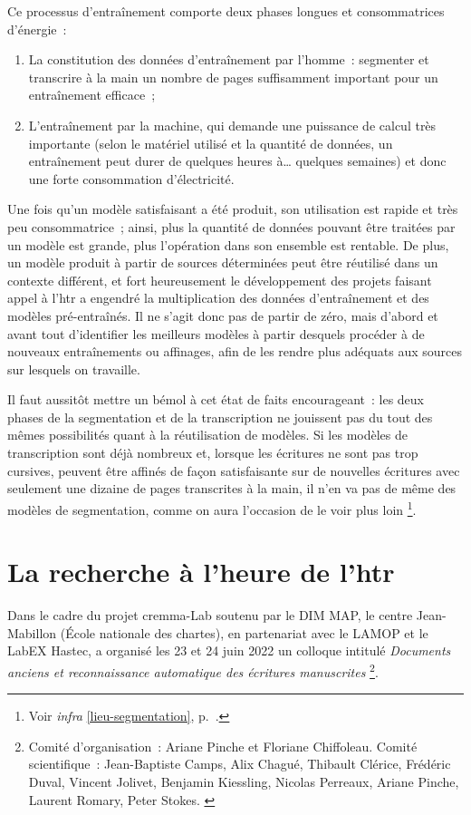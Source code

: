\documentclass[a4paper,12pt,twoside]{book}
\begin{document}
			Ce processus d'entraînement comporte deux phases longues et consommatrices d'énergie~:
			
			\begin{enumerate}
				\item La constitution des données d'entraînement par l'homme~: segmenter et transcrire à la main un nombre de pages suffisamment important pour un entraînement efficace~;
				\item L'entraînement par la machine, qui demande une puissance de calcul très importante (selon le matériel utilisé et la quantité de données, un entraînement peut durer de quelques heures à… quelques semaines) et donc une forte consommation d'électricité.
			\end{enumerate}
			
			Une fois qu'un modèle satisfaisant a été produit, son utilisation est rapide et très peu consommatrice~; ainsi, plus la quantité de données pouvant être traitées par un modèle est grande, plus l'opération dans son ensemble est rentable. De plus, un modèle produit à partir de sources déterminées peut être réutilisé dans un contexte différent, et fort heureusement le développement des projets faisant appel à l'\gls{htr} a engendré la multiplication des données d'entraînement et des modèles pré-entraînés. Il ne s'agit donc pas de partir de zéro, mais d'abord et avant tout d'identifier les meilleurs modèles à partir desquels procéder à de nouveaux entraînements ou affinages, afin de les rendre plus adéquats aux sources sur lesquels on travaille.
			
			Il faut aussitôt mettre un bémol à cet état de faits encourageant~: les deux phases de la \gls{segmentation} et de la transcription ne jouissent pas du tout des mêmes possibilités quant à la réutilisation de modèles. Si les modèles de transcription sont déjà nombreux et, lorsque les écritures ne sont pas trop cursives, peuvent être affinés de façon satisfaisante sur de nouvelles écritures avec seulement une dizaine de pages transcrites à la main, il n'en va pas de même des modèles de \gls{segmentation}, comme on aura l'occasion de le voir plus loin
			\footnote{Voir \textit{infra} \ref{lieu-segmentation}, p.~\pageref{lieu-segmentation}.}.
		
		\section{La recherche à l'heure de l'\gls{htr}}
		
			Dans le cadre du projet \gls{cremma}-Lab soutenu par le DIM MAP, le centre
			Jean-Mabillon (École nationale des chartes), en partenariat avec le
			LAMOP et le LabEX Hastec, a organisé les 23 et 24 juin 2022 un colloque
			intitulé \textit{Documents anciens et reconnaissance automatique des écritures manuscrites}
			\footnote{Comité d'organisation~: Ariane Pinche et Floriane Chiffoleau. Comité scientifique~: Jean-Baptiste Camps, Alix Chagué, Thibault Clérice, Frédéric Duval, Vincent Jolivet, Benjamin Kiessling, Nicolas Perreaux, Ariane Pinche, Laurent Romary, Peter Stokes. \cite{DocumentsAnciensReconnaissance}}.
			
\end{document}
